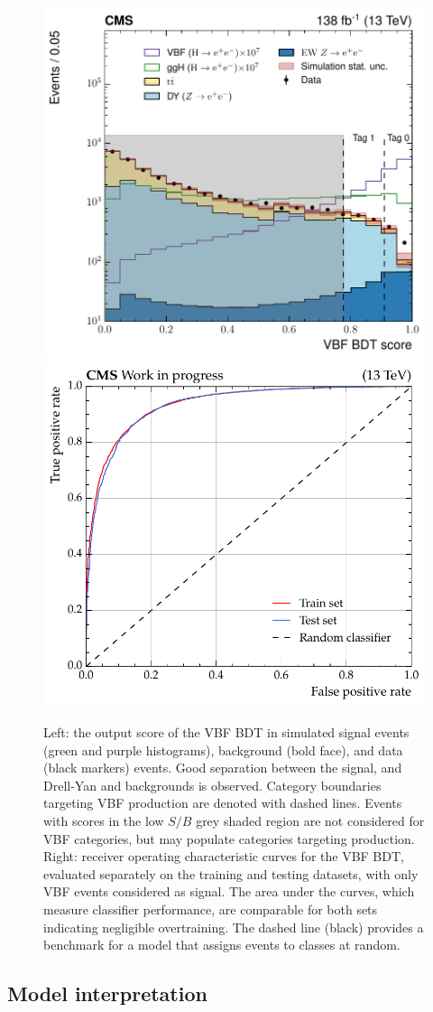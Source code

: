 \begin{figure}[htbp!]
\centering
\includegraphics[width =0.485\linewidth]{Figures/Hee/VBF/dataMC/VBF_BDT_output_score_paper.pdf}\hfill%
\includegraphics[width =0.5\linewidth]{Figures/Hee/VBF/dataMC/VBF_BDT_ROC_curve.pdf}\hfill%
\caption[The output score of the VBF BDT and associated ROC curve.]{Left: the output score of the VBF BDT in simulated signal events (green and purple histograms), background (bold face), and data (black markers) events. Good separation between the signal, and Drell-Yan and \ttbar backgrounds is observed. Category boundaries targeting VBF production are denoted with dashed lines. Events with scores in the low $S/B$ grey shaded region are not considered for VBF categories, but may populate categories targeting \ggH production. Right: receiver operating characteristic curves for the VBF BDT, evaluated separately on the training and testing datasets, with only VBF events considered as signal. The area under the curves, which measure classifier performance, are comparable for both sets indicating negligible overtraining. The dashed line (black) provides a benchmark for a model that assigns events to classes at random.}
\label{fig:vbf_out_score_and_rocs}
\end{figure}

\subsection{Model interpretation}

